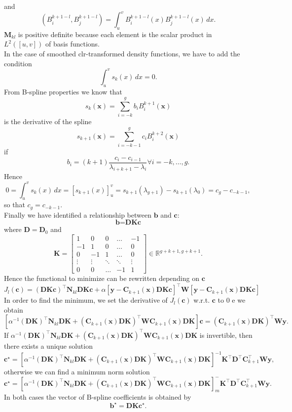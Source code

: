 and \[(B_{i}^{k+1-l}, B_{j}^{k+1-l}) = \int_u^v B_{i}^{k+1-l}(x)B_{j}^{k+1-l}(x) \, dx.\]
$\textbf{M}_{kl}$ is positive definite because each element is the scalar product in $L^2([u,v])$ of basis functions. \\
In the case of  smoothed clr-transformed density functions, we have to add the condition
\[\int_u^v s_k(x) \, dx = 0.\] 
From B-spline properties we know that 
\[  s_k(\textbf{x})=\sum\limits_{i=-k}^{g}b_iB_i^{k+1}(\textbf{x}) \]
is the derivative of the spline
\[  s_{k+1}(\textbf{x})=\sum\limits_{i=-k-1}^{g}c_iB_i^{k+2}(\textbf{x}) \]
if
\[b_i = (k+1)\frac{c_i-c_{i-1}}{\lambda_{i+k+1}-\lambda_{i}} \forall i = -k, \dots, g.\]
Hence 
\[ 0 = \int_u^v s_k(x) \, dx = [s_{k+1}(x)]_u^v = s_{k+1}(\lambda_{g+1})-s_{k+1}(\lambda_{0}) = c_g-c_{-k-1},\]
so that $c_g = c_{-k-1}$.\\
Finally we have identified a relationship between $\textbf{b}$ and $\textbf{c}$:
\[\textbf{b} = \textbf{D}\textbf{K}\textbf{c}\] 
where $ \textbf{D} = \textbf{D}_0$ and
\[  \textbf{K} =
\begin{bmatrix}
1 &0&0& \dots  & -1 \\
-1 &1&0& \dots  & 0 \\
0 &-1&1& \dots  & 0 \\
\vdots &\vdots & \ddots & \ddots& \vdots \\
0 &0 & \dots&-1  & 1
\end{bmatrix} \in \mathbb{R}^{g+k+1, g+k+1}. \]
Hence the functional to minimize can be rewritten depending on $\textbf{c}$
\[J_l(\textbf{c}) = (\textbf{D}\textbf{K}\textbf{c})^\top \textbf{N}_{kl}\textbf{D}\textbf{K}\textbf{c} + \alpha [\textbf{y}-\textbf{C}_{k+1}(\textbf{x})\textbf{D}\textbf{K}\textbf{c}]^\top \textbf{W} [\textbf{y}-\textbf{C}_{k+1}(\textbf{x})\textbf{D}\textbf{K}\textbf{c}]\]
In order to find the minimum, we set the derivative of $J_l(\textbf{c})$ w.r.t. $\textbf{c}$ to 0 e we obtain
\[ [\alpha^{-1}(\textbf{D}\textbf{K})^\top \textbf{N}_{kl} \textbf{D}\textbf{K}+ (\textbf{C}_{k+1}(\textbf{x})\textbf{D}\textbf{K})^\top\textbf{W}\textbf{C}_{k+1}(\textbf{x})\textbf{D}\textbf{K}]\textbf{c} = (\textbf{C}_{k+1}(\textbf{x})\textbf{D}\textbf{K})^\top \textbf{W}\textbf{y}.\]
If $\alpha^{-1}(\textbf{D}\textbf{K})^\top \textbf{N}_{kl} \textbf{D}\textbf{K}+ (\textbf{C}_{k+1}(\textbf{x})\textbf{D}\textbf{K})^\top\textbf{W}\textbf{C}_{k+1}(\textbf{x})\textbf{D}\textbf{K}$ is invertible, then there exists a unique solution 
\[\textbf{c}^\star = [\alpha^{-1}(\textbf{D}\textbf{K})^\top \textbf{N}_{kl} \textbf{D}\textbf{K}+ (\textbf{C}_{k+1}(\textbf{x})\textbf{D}\textbf{K})^\top\textbf{W}\textbf{C}_{k+1}(\textbf{x})\textbf{D}\textbf{K}]^{-1}\textbf{K}^\top\textbf{D}^\top\textbf{C}_{k+1}^\top \textbf{W}\textbf{y},\]
otherwise we can find a minimum norm solution
\[\textbf{c}^\star = [\alpha^{-1}(\textbf{D}\textbf{K})^\top \textbf{N}_{kl} \textbf{D}\textbf{K}+ (\textbf{C}_{k+1}(\textbf{x})\textbf{D}\textbf{K})^\top\textbf{W}\textbf{C}_{k+1}(\textbf{x})\textbf{D}\textbf{K}]_{m}^{-}\textbf{K}^\top\textbf{D}^\top\textbf{C}_{k+1}^\top \textbf{W}\textbf{y}.\]
In both cases the vector of B-spline coefficients is obtained by
\[\textbf{b}^\star = \textbf{D}\textbf{K}\textbf{c}^\star.\] 
